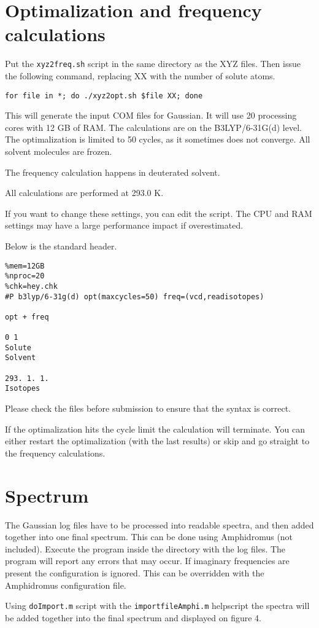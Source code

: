 \section{Optimalization and frequency calculations}
Put the \verb|xyz2freq.sh| script in the same directory as the XYZ files. Then 
issue the following command, replacing XX with the number of solute atoms.

\begin{lstlisting}[caption=XYZ to COM]
for file in *; do ./xyz2opt.sh $file XX; done
\end{lstlisting}

This will generate the input COM files for Gaussian. It will use 20 processing 
cores with 12 GB of RAM. The calculations are on the B3LYP/6-31G(d) level. 
The optimalization is limited to 50 cycles, as it sometimes does not converge.
All solvent molecules are frozen.

The frequency calculation happens in deuterated solvent.

All calculations are performed at 293.0 K.

\null

If you want to change these settings, you can edit the script. The CPU and RAM 
settings may have a large performance impact if overestimated.

Below is the standard header.
\begin{verbatim}
%mem=12GB
%nproc=20
%chk=hey.chk
#P b3lyp/6-31g(d) opt(maxcycles=50) freq=(vcd,readisotopes)

opt + freq

0 1
Solute
Solvent

293. 1. 1.
Isotopes

\end{verbatim}

Please check the files before submission to ensure that the syntax is correct. 

If the optimalization hits the cycle limit the calculation will terminate.
You can either restart the optimalization (with the last results) or skip and 
go straight to the frequency calculations.

\section{Spectrum}
The Gaussian log files have to be processed into readable spectra, and then 
added together into one final spectrum. This can be done using Amphidromus (not 
included). 
Execute the program inside the directory with the log files. The program will 
report any errors that may occur. If imaginary frequencies are present the 
configuration is ignored. This can be overridden with the Amphidromus 
configuration file.

Using \verb|doImport.m| script with the \verb|importfileAmphi.m| helpscript the 
spectra will be added together into the final spectrum and displayed on figure 
4.
